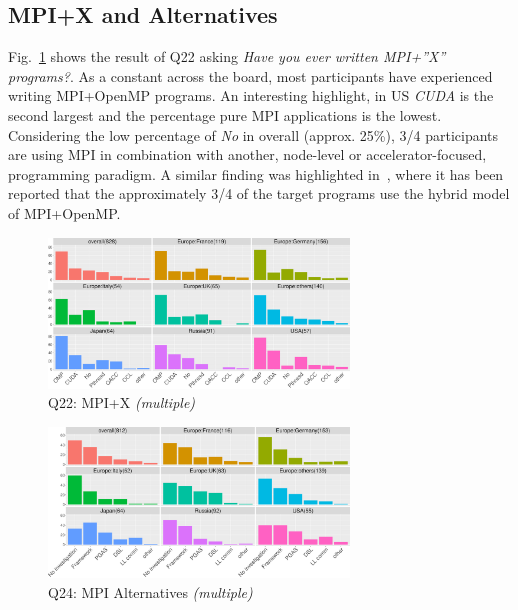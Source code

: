 \documentclass[preprint,5p,times]{elsarticle}
\def\myquote#1{{\it #1}}
\begin{document}
\subsection{MPI+X and Alternatives}

Fig.~\ref{fig:mpi-x} shows the result of Q22 asking \myquote{Have you ever
written MPI+''X'' programs?}. As a constant across the board, most participants
have experienced writing MPI+OpenMP programs. An interesting highlight, in US
\myquote{CUDA} is the second largest and the percentage pure MPI applications is
the lowest. Considering the low percentage of \myquote{No} in overall (approx.
25\%), 3/4 participants are using MPI in combination with another, node-level or
accelerator-focused, programming paradigm. A similar finding was highlighted
in~\cite{10.1145/3295500.3356176}, where it has been reported that the
approximately 3/4 of the target programs use the hybrid model of MPI+OpenMP.

\begin{figure}[htb]
\begin{center}
\includegraphics[width=8.0cm]{R-scripts/Q22.pdf}
\vspace{-2mm}
\caption{Q22: MPI+X {\it(multiple)}}
\label{fig:mpi-x}
\end{center}
\end{figure}

\begin{figure}[htb]
\begin{center}
\includegraphics[width=8.0cm]{R-scripts/Q24.pdf}
\vspace{-2mm}
\caption{Q24: MPI Alternatives {\it(multiple)}}
\label{fig:mpi-alternatives}
\end{center}
\end{figure}
\end{document}
